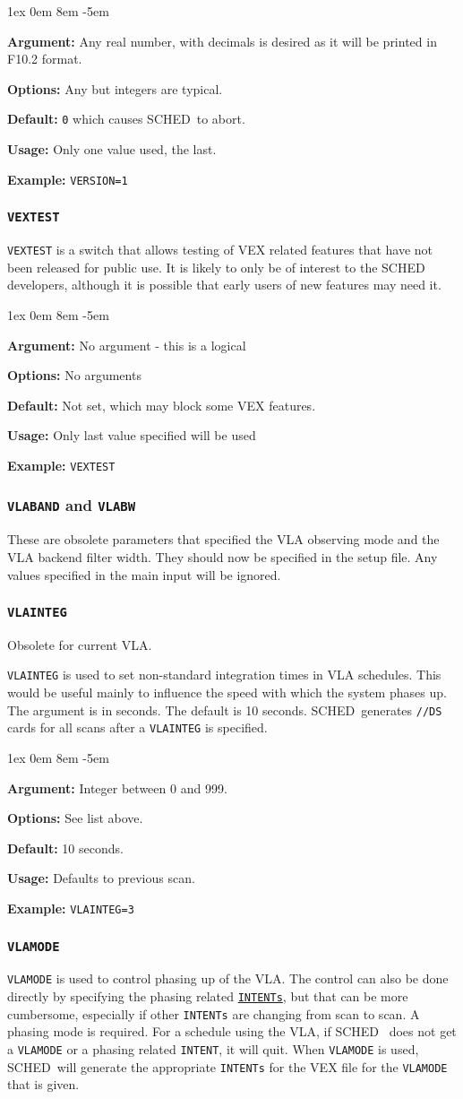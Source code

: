 \documentclass{report}
\newcommand{\schedb}{{\sc SCHED~}}
\newcommand{\rcwbox}[5]{
  \begin{list}{}{\parsep 1ex  \itemsep 0em
                 \leftmargin 8em  \itemindent -5em }
    \item {\bf Argument:} #1
    \item {\bf Options:}  #2
    \item {\bf Default:}  #3
    \item {\bf Usage:}    #4
    \item {\bf Example:}  #5
  \end{list}
}
\begin{document}
\rcwbox
{Any real number, with decimals is desired as it will be printed in
F10.2 format.}
{Any but integers are typical.}
{{\tt 0} which causes \schedb to abort.}
{Only one value used, the last.}
{{\tt VERSION=1}}


\subsubsection{\label{MP:VEXTEST}{\tt VEXTEST}}

{\tt VEXTEST} is a switch that allows testing of VEX related features
that have not been released for public use.  It is likely to only be
of interest to the SCHED developers, although it is possible that
early users of new features may need it.

\rcwbox
{No argument - this is a logical}
{No arguments}
{Not set, which may block some VEX features.}
{Only last value specified will be used}
{{\tt VEXTEST}}

\subsubsection{{\tt VLABAND} and {\tt VLABW}}

These are obsolete parameters that specified the VLA observing mode
and the VLA backend filter width.  They should now be specified in
the setup file.  Any values specified in the main input will be
ignored.


\subsubsection{\label{MP:VLAINTEG}{\tt VLAINTEG}}

Obsolete for current VLA.

{\tt VLAINTEG} is used to set non-standard integration times in VLA
schedules.  This would be useful mainly to influence the speed with
which the system phases up.  The argument is in seconds.  The default
is 10 seconds.  \schedb generates {\tt //DS} cards for all scans
after a {\tt VLAINTEG} is specified.

\rcwbox
{Integer between 0 and 999.}
{See list above.}
{10 seconds.}
{Defaults to previous scan.}
{{\tt VLAINTEG=3}}


\subsubsection{\label{MP:VLAMODE}{\tt VLAMODE}}

{\tt VLAMODE} is used to control phasing up of the VLA.  The control
can also be done directly by specifying the phasing related
{\hyperref[MP:INTENTs]{{\tt INTENTs}}}, but that can be more cumbersome,
especially if other {\tt INTENTs} are changing from scan to scan.  A
phasing mode is required.  For a schedule using the VLA, if \schedb
does not get a {\tt VLAMODE} or a phasing related {\tt INTENT}, it
will quit.  When {\tt VLAMODE} is used, \schedb will generate the
appropriate {\tt INTENTs} for the VEX file for the {\tt VLAMODE} that
is given.
\end{document}
